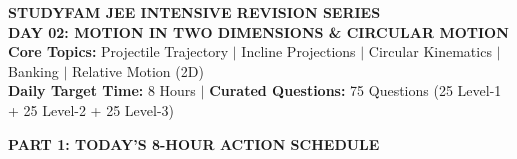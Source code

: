 \documentclass[11pt,a4paper]{article}
\begin{document}
\begin{tcolorbox}[dayheader]
\begin{center}
  {\Large \textbf{\textsf{\textcolor{goldAccent}{STUDYFAM JEE INTENSIVE REVISION SERIES}}}}\\[3pt]
  {\LARGE \textbf{\textsf{DAY 02: MOTION IN TWO DIMENSIONS \& CIRCULAR MOTION}}}\\[5pt]
  {\normalsize \textbf{\textsf{Core Topics:}} Projectile Trajectory $\vert$ Incline Projections $\vert$ Circular Kinematics $\vert$ Banking $\vert$ Relative Motion (2D)}\\[3pt]
  {\footnotesize \textbf{Daily Target Time:} 8 Hours \quad $\vert$ \quad \textbf{Curated Questions:} 75 Questions (25 Level-1 + 25 Level-2 + 25 Level-3)}
\end{center}
\end{tcolorbox}

\vspace{6pt}

\begin{tcolorbox}[sectionbanner]
  {\large \textbf{\textsf{PART 1: TODAY'S 8-HOUR ACTION SCHEDULE}}}
\end{tcolorbox}
\vspace{2pt}
\end{document}
